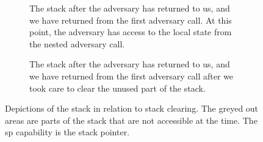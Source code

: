 \documentclass[format=acmsmall, review=true, screen=true]{acmart}
\begin{document}
\begin{figure}[ptb]
\begin{subfigure}[t]{0.3\linewidth}
  \caption{The stack after the adversary has returned to us, and we have
    returned from the first adversary call. At this point, the adversary has
    access to the local state from the nested adversary call.}
  \label{fig:illu-adv-data}
\end{subfigure}
\begin{subfigure}[t]{0.02\linewidth}
  \phantom{a}
\end{subfigure}
  \begin{subfigure}[t]{0.3\linewidth}
  \caption{The stack after the adversary has returned to us, and we have
    returned from the first adversary call after we took care to clear the
    unused part of the stack.}
  \label{fig:illu-clear-all}
  \end{subfigure}
  \caption{Depictions of the stack in relation to stack clearing.
    The greyed out areas are parts of the stack that are not accessible at the
    time.
    The sp capability is the stack pointer.}
  \label{fig:ret-adv2}
\end{figure}
\end{document}
